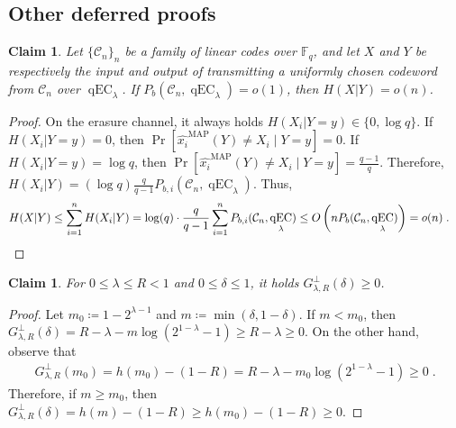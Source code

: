 \documentclass{article}
\DeclareMathOperator{\qEC}{qEC}
\DeclareMathOperator{\MAP}{MAP}
\newcommand{\cC}{\mathcal{C}}
\newcommand{\bF}{\mathbb{F}}
\theoremstyle{plain}
\theoremstyle{plain}
\theoremstyle{plain}
\theoremstyle{plain}
\theoremstyle{plain}
\theoremstyle{plain}
\newtheorem{claim}[definition]{Claim}%
\theoremstyle{plain}
\theoremstyle{plain}
\theoremstyle{plain}
\theoremstyle{plain}
\theoremstyle{remark}
\theoremstyle{remark}
\theoremstyle{remark}
\theoremstyle{plain}
\begin{document}
\subsection{Other deferred proofs}

\begin{claim}
    \label{cl:pbit-implies-entropy}
    Let $\{\cC_n\}_n$ be a family of linear codes over $\bF_q$, and let $X$ and $Y$ be respectively the input and output of transmitting 
    a uniformly chosen codeword from
    $\cC_n$ over $\qEC_\lambda$. If $P_{b}(\cC_n,\qEC_\lambda)=o(1)$, then $H(X|Y)=o(n)$.
\end{claim}
\begin{proof}
    On the erasure channel, it always holds $H(X_i|Y=y)\in\{0,\log q\}$. 
    If $H(X_i|Y=y)=0$, then $\Pr[\hat{x_i}^{\MAP}(Y)\ne X_i\;\vert\;Y=y]=0$.
    If $H(X_i|Y=y)=\log q$, then
    $\Pr[\hat{x_i}^{\MAP}(Y)\ne X_i\;\vert\;Y=y]=\frac{q-1}{q}$.
    Therefore, 
    $H(X_i|Y)=(\log q)\frac{q}{q-1} P_{b,i}(\cC_n, \qEC_\lambda)$.
    Thus,
\begin{align*}
    H(X|Y)&\le\sum_{i=1}^{n}H(X_i|Y)= \log(q)\cdot\frac{q}{q-1}\sum_{i=1}^{n}P_{b,i}(\cC_n,\qEC_\lambda)\le O\left(nP_{b}(\cC_n,\qEC_\lambda)\right)=o(n)\;.\qedhere
\end{align*}
\end{proof}

\begin{claim}
\label{prop:negative_G}
    For $0\le\lambda\le R< 1$ and $0\le\delta\le 1$, it holds
    $G^\perp_{\lambda,R}(\delta)\ge 0$.
\end{claim}
\begin{proof}
    Let $m_0\coloneqq 1-2^{\lambda-1}$ and $m\coloneqq \min(\delta,1-\delta)$.
    If $m<m_0$, then $G^\perp_{\lambda,R}(\delta)=R-\lambda-m\log(2^{1-\lambda}-1)\ge R-\lambda\ge 0$.
    On the other hand, observe that
    \begin{align*}
    G^\perp_{\lambda,R}(m_0)=h(m_0)-(1-R)=R-\lambda-m_0\log(2^{1-\lambda}-1)\ge 0\;.
    \end{align*}
    Therefore, if $m\ge m_0$, then 
    $G^\perp_{\lambda,R}(\delta)=h(m)-(1-R)\ge h(m_0)-(1-R)\ge 0$.
\end{proof}



\end{document}
